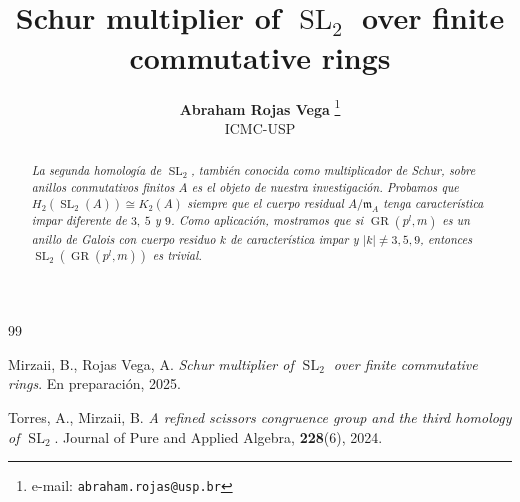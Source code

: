 \documentclass[10pt]{article}
\date{ }
\title{\header\\ \textbf{Schur multiplier of $\operatorname{SL}_2$ over finite commutative rings}}
\author{
	\textbf{Abraham Rojas Vega }%
	\thanks{e-mail: \texttt{abraham.rojas@usp.br}}%
	\\%
	ICMC-USP}
\begin{document}
	\maketitle
	\begin{abstract}
		\noindent \textit{
		La segunda homología de $\operatorname{SL}_2$, también conocida como multiplicador de Schur, sobre anillos conmutativos finitos $A$ es el objeto de nuestra investigación. Probamos que $H_2 (\operatorname{SL}_2(A)) \cong K_2(A)$ siempre que el cuerpo residual $ A / \mathfrak{m}_A $ tenga característica impar diferente de $3, \ 5$ y $9$. Como aplicación, mostramos que si $\operatorname{GR}(p^l,m)$ es un anillo de Galois con cuerpo residuo $k$ de característica impar y $|k| \neq 3,5,9$, entonces $\operatorname{SL}_2(\operatorname{GR}(p^l,m))$ es trivial.
		}
		\vspace{2cm}
	\end{abstract}
	
	
	
	
	\begin{thebibliography}{99}
		
		Mirzaii, B., Rojas Vega, A.
		\textit{Schur multiplier of $\operatorname{SL}_2$ over finite commutative rings}.
		En preparación, 2025.

		Torres, A., Mirzaii, B.
		\textit{A refined scissors congruence group and the third homology of $\operatorname{SL}_2$}. Journal of Pure and Applied Algebra, \textbf{228}(6), 2024.
	\end{thebibliography}
\end{document}
